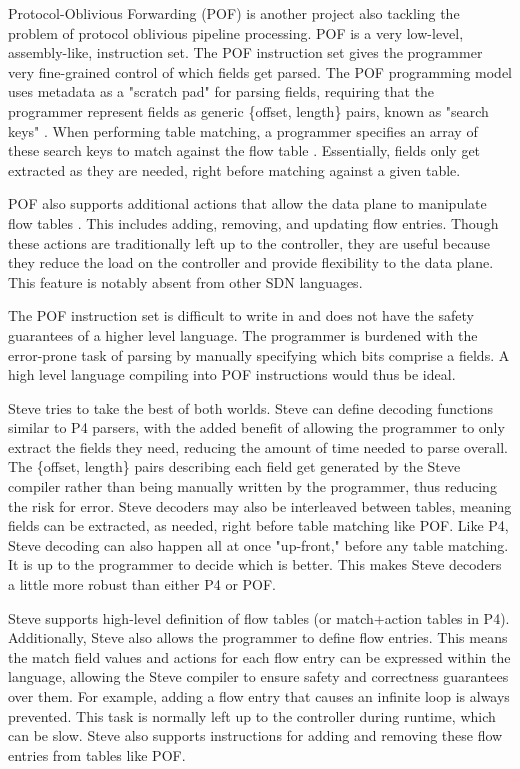 Protocol-Oblivious Forwarding (POF) \cite{pof_fis, pof, pof_impl} is another
project also tackling the problem of protocol oblivious pipeline processing. POF
is a very low-level, assembly-like, instruction set. The POF instruction
set gives the programmer very fine-grained control of which fields get parsed.
The POF programming model uses metadata as a "scratch pad" for parsing fields,
requiring that the
programmer represent fields as generic \{offset, length\} pairs, known as
"search keys" \cite{pof}. When performing table matching, a programmer specifies
an array of these search keys to match against the flow table \cite{pof_impl}.
Essentially, fields only get extracted as they are needed, right before matching
against a given table.

POF also supports additional actions that allow the data plane to manipulate
flow tables \cite{pof}. This includes adding, removing, and updating flow
entries. Though these actions are traditionally left up to the controller, they
are useful because they reduce the load on the controller and provide
flexibility to the data plane. This feature is notably absent from other SDN
languages.

The POF instruction set is difficult to write in and does not have the safety
guarantees of a higher level language. The programmer is burdened with the
error-prone task of parsing by manually specifying which bits comprise a fields. 
A high level language compiling into POF instructions would thus be ideal.

Steve tries to take the best of both worlds. Steve can define decoding functions
similar to P4 parsers, with the added benefit of allowing the programmer to only
extract the fields they need, reducing the amount of time needed to parse
overall. The \{offset, length\} pairs describing each field get generated by the
Steve compiler rather than being manually written by the programmer, thus
reducing
the risk for error. Steve decoders may also be interleaved between tables,
meaning fields can be extracted, as needed, right before table matching like
POF. Like P4,
Steve decoding can also happen all at once "up-front," before any table
matching. 
It is up to the programmer to decide which is better. This makes Steve
decoders a little more robust than either P4 or POF. 

Steve supports high-level definition of flow tables (or match+action tables in
P4). Additionally, Steve also allows the programmer to define flow entries. This
means the match field values and actions for each flow entry can be expressed
within the language, allowing the Steve compiler to ensure safety and
correctness guarantees over them. For example, adding a flow entry that causes
an infinite loop is always prevented. This task is normally left up to the
controller during runtime, which can be slow. Steve also supports instructions
for adding and removing these flow entries from tables like POF.

